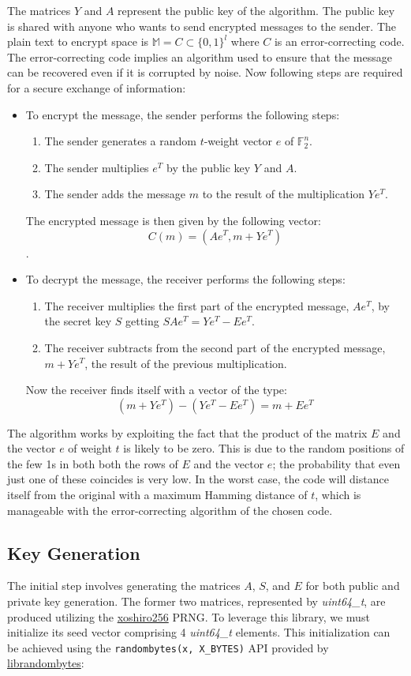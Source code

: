 The matrices $Y$ and $A$ represent the public key of the algorithm. The public key is shared with anyone who wants to send encrypted messages to the sender.
The plain text to encrypt space is $\mathbb{M} = C \subset \{0,1\}^l $ where $C$ is an error-correcting code. The error-correcting code implies an algorithm used to ensure that the message can be recovered even if it is corrupted by noise.
Now following steps are required for a secure exchange of information:
\begin{itemize}
 \item To encrypt the message, the sender performs the following steps:
    \begin{enumerate}
     \item The sender generates a random $t$-weight vector $e$ of $\mathbb{F}_2^n $.
     \item The sender multiplies $e^T$ by the public key $Y$ and $A$.
     \item The sender adds the message $m$ to the result of the multiplication $Ye^T$.
    \end{enumerate}
    The encrypted message is then given by the following vector: $$C(m) = (Ae^T, m+Ye^T)$$.
    \item To decrypt the message, the receiver performs the following steps:
    \begin{enumerate}
     \item The receiver multiplies the first part of the encrypted message, $Ae^T$, by the secret key $S$ getting $SAe^T = Ye^T-Ee^T $.
     \item The receiver subtracts from the second part of the encrypted message, $m+Ye^T$, the result of the previous multiplication.
    \end{enumerate}
    Now the receiver finds itself with a vector of the type: $$(m+Ye^T) - (Ye^T-Ee^T) = m + Ee^T$$
\end{itemize}
The algorithm works by exploiting the fact that the product of the matrix $E$ and the vector $e$ of weight $t$ is likely to be zero. This is due to the random positions of the few 1s in both both the rows of $E$ and the vector $e$; the probability that even just one of these coincides is very low.
In the worst case, the code will distance itself from the original with a maximum Hamming distance of $t$, which is manageable with the error-correcting algorithm of the chosen code.

\subsection{Key Generation}
The initial step involves generating the matrices \(A\), \(S\), and \(E\) for both public and private key generation. The former two matrices, represented by \textit{uint64\_t}, are produced utilizing the \href{https://prng.di.unimi.it}{xoshiro256} PRNG. To leverage this library, we must initialize its seed vector comprising 4 \textit{uint64\_t} elements. This initialization can be achieved using the \texttt{randombytes(x, X\_BYTES)} API provided by \href{https://randombytes.cr.yp.to/index.html}{librandombytes}:

